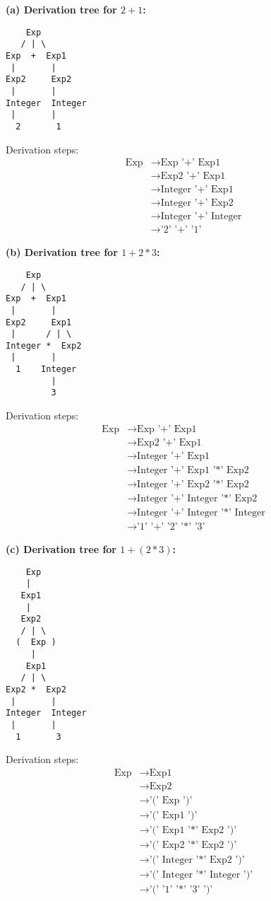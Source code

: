 \documentclass{article}
\theoremstyle{plain}
\theoremstyle{definition}
\theoremstyle{remark}
\begin{document}
\textbf{(a) Derivation tree for $2+1$:}

\begin{verbatim}
    Exp
   / | \
Exp  +  Exp1
 |       |
Exp2     Exp2
 |       |
Integer  Integer
 |       |
  2       1
\end{verbatim}

Derivation steps:
\begin{align}
\text{Exp} &\to \text{Exp '+' Exp1} \\
&\to \text{Exp2 '+' Exp1} \\
&\to \text{Integer '+' Exp1} \\
&\to \text{Integer '+' Exp2} \\
&\to \text{Integer '+' Integer} \\
&\to \text{'2' '+' '1'}
\end{align}

\textbf{(b) Derivation tree for $1+2*3$:}

\begin{verbatim}
    Exp
   / | \
Exp  +  Exp1
 |       |
Exp2     Exp1
 |      / | \
Integer *  Exp2
 |       |
  1    Integer
         |
         3
\end{verbatim}

Derivation steps:
\begin{align}
\text{Exp} &\to \text{Exp '+' Exp1} \\
&\to \text{Exp2 '+' Exp1} \\
&\to \text{Integer '+' Exp1} \\
&\to \text{Integer '+' Exp1 '*' Exp2} \\
&\to \text{Integer '+' Exp2 '*' Exp2} \\
&\to \text{Integer '+' Integer '*' Exp2} \\
&\to \text{Integer '+' Integer '*' Integer} \\
&\to \text{'1' '+' '2' '*' '3'}
\end{align}

\textbf{(c) Derivation tree for $1+(2*3)$:}

\begin{verbatim}
    Exp
    |
   Exp1
    |
   Exp2
   / | \
  (  Exp )
     |
    Exp1
   / | \
Exp2 *  Exp2
 |       |
Integer  Integer
 |       |
  1       3
\end{verbatim}

Derivation steps:
\begin{align}
\text{Exp} &\to \text{Exp1} \\
&\to \text{Exp2} \\
&\to \text{'(' Exp ')'} \\
&\to \text{'(' Exp1 ')'} \\
&\to \text{'(' Exp1 '*' Exp2 ')'} \\
&\to \text{'(' Exp2 '*' Exp2 ')'} \\
&\to \text{'(' Integer '*' Exp2 ')'} \\
&\to \text{'(' Integer '*' Integer ')'} \\
&\to \text{'(' '1' '*' '3' ')'}
\end{align}
\end{document}

